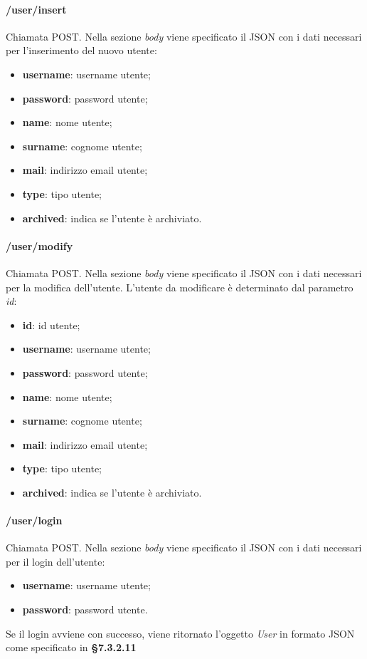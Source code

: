 \paragraph{/user/insert}
Chiamata POST. Nella sezione \textit{body} viene specificato il JSON con i dati necessari per l'inserimento del nuovo utente:
\begin{itemize}
	\item \textbf{username}: username utente;
	\item \textbf{password}: password utente;
	\item \textbf{name}: nome utente;
	\item \textbf{surname}: cognome utente;	
	\item \textbf{mail}: indirizzo email utente;	
	\item \textbf{type}: tipo utente;	
	\item \textbf{archived}: indica se l'utente è archiviato.	
\end{itemize}

\paragraph{/user/modify}
Chiamata POST. Nella sezione \textit{body} viene specificato il JSON con i dati necessari per la modifica dell'utente. L'utente da modificare è determinato dal parametro \textit{id}:
\begin{itemize}
	\item \textbf{id}: id utente;
	\item \textbf{username}: username utente;
	\item \textbf{password}: password utente;
	\item \textbf{name}: nome utente;
	\item \textbf{surname}: cognome utente;	
	\item \textbf{mail}: indirizzo email utente;	
	\item \textbf{type}: tipo utente;	
	\item \textbf{archived}: indica se l'utente è archiviato.	
\end{itemize}

\paragraph{/user/login}
Chiamata POST. Nella sezione \textit{body} viene specificato il JSON con i dati necessari per il login dell'utente:
\begin{itemize}
	\item \textbf{username}: username utente;
	\item \textbf{password}: password utente.	
\end{itemize}
Se il login avviene con successo, viene ritornato l'oggetto \textit{User} in formato JSON come specificato in \textbf{§7.3.2.11}
